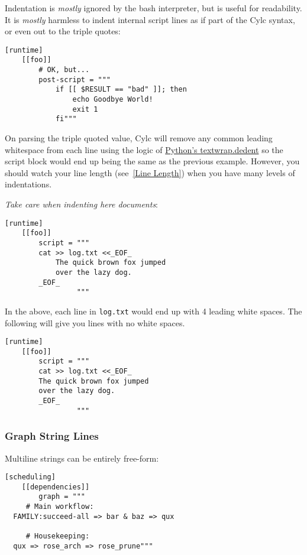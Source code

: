 Indentation is {\em mostly} ignored by the bash interpreter, but is useful for
readability. It is {\em mostly} harmless to indent internal script lines as if
part of the Cylc syntax, or even out to the triple quotes:

\lstset{language=suiterc}
\begin{lstlisting}
[runtime]
    [[foo]]
        # OK, but...
        post-script = """
            if [[ $RESULT == "bad" ]]; then
                echo Goodbye World!
                exit 1
            fi"""
\end{lstlisting}

On parsing the triple quoted value, Cylc will remove any common leading
whitespace from each line using the logic of
\href{https://docs.python.org/2/library/textwrap.html#textwrap.dedent}{Python's textwrap.dedent}
so the script block would end up being the same as the previous example.
However, you should watch your line length (see~\ref{Line Length}) when you
have many levels of indentations.

{\em Take care when indenting here documents}:

\lstset{language=suiterc}
\begin{lstlisting}
[runtime]
    [[foo]]
        script = """
        cat >> log.txt <<_EOF_
            The quick brown fox jumped
            over the lazy dog.
        _EOF_
                 """
\end{lstlisting}

In the above, each line in \lstinline=log.txt= would end up with 4 leading
white spaces. The following will give you lines with no white spaces.

\lstset{language=suiterc}
\begin{lstlisting}
[runtime]
    [[foo]]
        script = """
        cat >> log.txt <<_EOF_
        The quick brown fox jumped
        over the lazy dog.
        _EOF_
                 """
\end{lstlisting}

\subsubsection{Graph String Lines}

Multiline \lstinline@graph@ strings can be entirely free-form:

\lstset{language=suiterc}
\begin{lstlisting}
[scheduling]
    [[dependencies]]
        graph = """
     # Main workflow:
  FAMILY:succeed-all => bar & baz => qux

     # Housekeeping:
  qux => rose_arch => rose_prune"""
\end{lstlisting}

